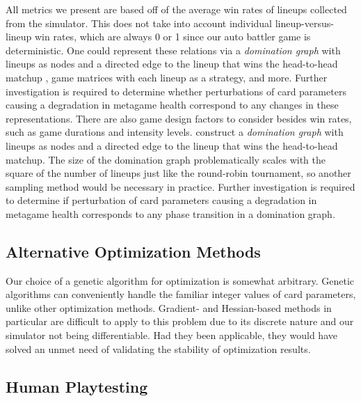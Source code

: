 \documentclass[letterpaper]{article} %
\begin{document}
All metrics we present are based off of the average win rates of lineups collected from the simulator. 
This does not take into account individual lineup-versus-lineup win rates, which are always 0 or 1 since
our auto battler game is deterministic. One could represent these relations via a
\textit{domination graph} with lineups
as nodes and a directed edge to the lineup that wins the head-to-head matchup \cite{gkmmmf_eaai21},
game matrices with each lineup as a strategy, and more.
Further investigation is required to determine whether perturbations of card parameters causing a degradation
in metagame health correspond to any changes in these representations.  There are also game design factors to consider besides win rates, such as game durations and intensity levels.
construct a \textit{domination graph} with lineups
as nodes and a directed edge to the lineup that wins the head-to-head matchup. The size of the domination
graph problematically scales with the square of the number of lineups just like the round-robin tournament,
so another sampling method would be necessary in practice. Further investigation is required to determine if perturbation of card parameters causing a degradation
in metagame health corresponds to any phase transition in a domination graph.
\fi



\subsection{Alternative Optimization Methods}

Our choice of a genetic algorithm for optimization is somewhat arbitrary. Genetic algorithms can conveniently 
handle the familiar integer values of card parameters, unlike other optimization methods. Gradient- and Hessian-based
methods in particular are difficult to apply to this problem due to its discrete nature and our simulator not being
differentiable. Had they been applicable, they would have solved an unmet need of %
validating the stability of optimization
results. %

\subsection{Human Playtesting}
\end{document}
